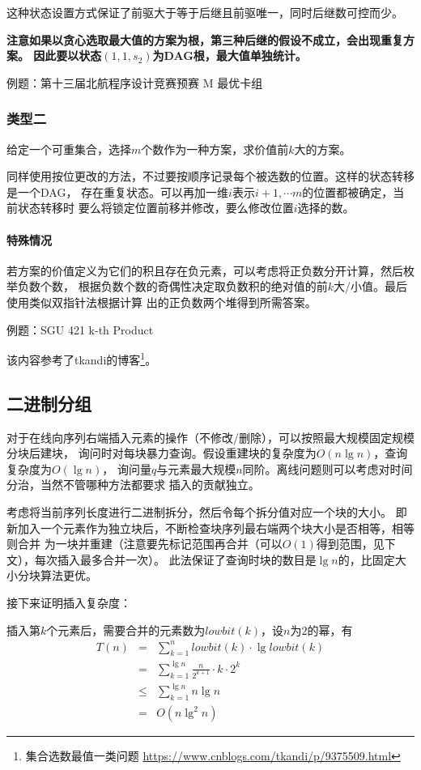 这种状态设置方式保证了前驱大于等于后继且前驱唯一，同时后继数可控而少。

{\bfseries 注意如果以贪心选取最大值的方案为根，第三种后继的假设不成立，会出现重复方案。
因此要以状态$(1,1,s_2)$为DAG根，最大值单独统计。}

例题：第十三届北航程序设计竞赛预赛 M 最优卡组


\subsubsection{类型二}
给定一个可重集合，选择$m$个数作为一种方案，求价值前$k$大的方案。

同样使用按位更改的方法，不过要按顺序记录每个被选数的位置。这样的状态转移是一个DAG，
存在重复状态。可以再加一维$i$表示$i+1,\cdots m$的位置都被确定，当前状态转移时
要么将锁定位置前移并修改，要么修改位置$i$选择的数。

\paragraph{特殊情况}
若方案的价值定义为它们的积且存在负元素，可以考虑将正负数分开计算，然后枚举负数个数，
根据负数个数的奇偶性决定取负数积的绝对值的前$k$大/小值。最后使用类似双指针法根据计算
出的正负数两个堆得到所需答案。

例题：SGU 421 k-th Product

该内容参考了tkandi的博客\footnote{
	集合选数最值一类问题
	\url{https://www.cnblogs.com/tkandi/p/9375509.html}
}。
\subsection{二进制分组}\label{BinIns}
对于在线向序列右端插入元素的操作（不修改/删除），可以按照最大规模固定规模分块后建块，
询问时对每块暴力查询。假设重建块的复杂度为$O(n\lg n)$，查询复杂度为$O(\lg n)$，
询问量$q$与元素最大规模$n$同阶。离线问题则可以考虑对时间分治，当然不管哪种方法都要求
插入的贡献独立。

考虑将当前序列长度进行二进制拆分，然后令每个拆分值对应一个块的大小。
即新加入一个元素作为独立块后，不断检查块序列最右端两个块大小是否相等，相等则合并
为一块并重建（注意要先标记范围再合并（可以$O(1)$得到范围，见下文），每次插入最多合并一次）。
此法保证了查询时块的数目是$\lg n$的，比固定大小分块算法更优。

接下来证明插入复杂度：

插入第$k$个元素后，需要合并的元素数为$lowbit(k)$，设$n$为$2$的幂，有
\begin{eqnarray*}
	T(n)&=&\sum_{k=1}^n {lowbit(k)\cdot \lg lowbit(k)}\\
	&=&\sum_{k=1}^{\lg n} {\frac{n}{2^{k+1}}\cdot k\cdot 2^k}\\
	&\leq&\sum_{k=1}^{\lg n} {n \lg n}\\
	&=&O(n\lg^2 n)
\end{eqnarray*}

